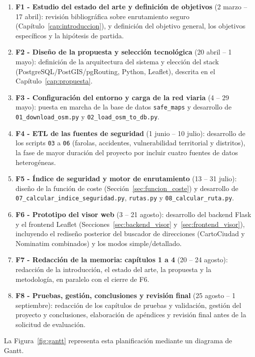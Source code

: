 \begin{enumerate}
    \item \textbf{F1 - Estudio del estado del arte y definición de objetivos} (2 marzo -- 17 abril): revisión bibliográfica sobre enrutamiento seguro (Capítulo~\ref{cap:introduccion}), y definición del objetivo general, los objetivos específicos y la hipótesis de partida.
    \item \textbf{F2 - Diseño de la propuesta y selección tecnológica} (20 abril -- 1 mayo): definición de la arquitectura del sistema y elección del stack (PostgreSQL/PostGIS/pgRouting, Python, Leaflet), descrita en el Capítulo~\ref{cap:propuesta}.
    \item \textbf{F3 - Configuración del entorno y carga de la red viaria} (4 -- 29 mayo): puesta en marcha de la base de datos \texttt{safe\_maps} y desarrollo de \texttt{01\_download\_osm.py} y \texttt{02\_load\_osm\_to\_db.py}.
    \item \textbf{F4 - ETL de las fuentes de seguridad} (1 junio -- 10 julio): desarrollo de los scripts \texttt{03} a \texttt{06} (farolas, accidentes, vulnerabilidad territorial y distritos), la fase de mayor duración del proyecto por incluir cuatro fuentes de datos heterogéneas.
    \item \textbf{F5 - Índice de seguridad y motor de enrutamiento} (13 -- 31 julio): diseño de la función de coste (Sección~\ref{sec:funcion_coste}) y desarrollo de \texttt{07\_calcular\_indice\_seguridad.py}, \texttt{rutas.py} y \texttt{08\_calcular\_ruta.py}.
    \item \textbf{F6 - Prototipo del visor web} (3 -- 21 agosto): desarrollo del backend Flask y el frontend Leaflet (Secciones~\ref{sec:backend_visor} y~\ref{sec:frontend_visor}), incluyendo el rediseño posterior del buscador de direcciones (CartoCiudad y Nominatim combinados) y los modos simple/detallado.
    \item \textbf{F7 - Redacción de la memoria: capítulos 1 a 4} (20 -- 24 agosto): redacción de la introducción, el estado del arte, la propuesta y la metodología, en paralelo con el cierre de F6.
    \item \textbf{F8 - Pruebas, gestión, conclusiones y revisión final} (25 agosto -- 1 septiembre): redacción de los capítulos de pruebas y validación, gestión del proyecto y conclusiones, elaboración de apéndices y revisión final antes de la solicitud de evaluación.
\end{enumerate}

La Figura~\ref{fig:gantt} representa esta planificación mediante un diagrama de Gantt.


